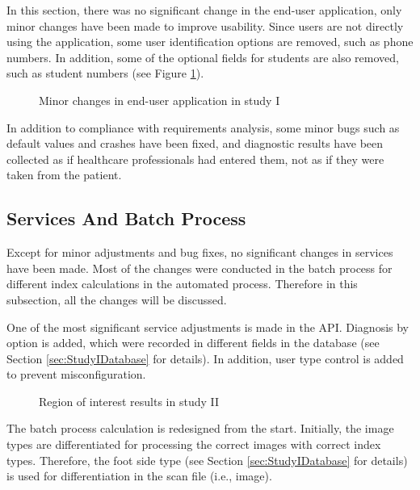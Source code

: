 In this section, there was no significant change in the end-user application, only minor changes have been made to improve usability. Since users are not directly using the application, some user identification options are removed, such as phone numbers. In addition, some of the optional fields for students are also removed, such as student numbers (see Figure \ref{fig:UserApplicationStudyIChanges}).

\begin{figure}[htbp]
\centering
{}
\caption{Minor changes in end-user application in study I}
\label{fig:UserApplicationStudyIChanges}
\end{figure}

In addition to compliance with requirements analysis, some minor bugs such as default values and crashes have been fixed, and diagnostic results have been collected as if healthcare professionals had entered them, not as if they were taken from the patient.

\subsection{Services And Batch Process}

Except for minor adjustments and bug fixes, no significant changes in services have been made. Most of the changes were conducted in the batch process for different index calculations in the automated process. Therefore in this subsection, all the changes will be discussed. 

One of the most significant service adjustments is made in the API. Diagnosis by option is added, which were recorded in different fields in the database (see Section \ref{sec:StudyIDatabase} for details). In addition, user type control is added to prevent misconfiguration.

\begin{figure}[htbp]
\centering
{}
\caption{Region of interest results in study II}
\label{fig:BatchProcessRioStudyII}
\end{figure}

The batch process calculation is redesigned from the start. Initially, the image types are differentiated for processing the correct images with correct index types. Therefore, the foot side type (see Section \ref{sec:StudyIDatabase} for details) is used for differentiation in the scan file (i.e., image).

